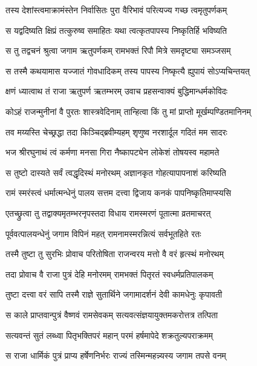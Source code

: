 \twolineshloka
{तस्य देशांस्त्वमाक्रामंस्तेन निर्वासितः पुरा}
{वैरिभावं परित्यज्य गच्छ त्वमृतुपर्णकम्}%

\twolineshloka
{स यद्वदिष्यति क्षिप्रं तत्कुरुष्व समाहितः}
{यथा त्वत्कृतपापस्य निष्कृतिर्हि भविष्यति}%

\twolineshloka
{स तु तद्वचनं श्रुत्वा जगाम ऋतुपर्णकम्}
{रामभक्तं रिपौ मित्रे समदृष्ट्या समञ्जसम्}%

\twolineshloka
{स तस्मै कथयामास यज्जातं गोवधादिकम्}
{तस्य पापस्य निष्कृत्यै ह्युपायं सोऽप्यचिन्तयत्}%

\twolineshloka
{क्षणं ध्यात्वाथ तं राजा ऋतुपर्ण ऋतम्भरम्}
{उवाच प्रहसन्वाक्यं बुद्धिमान्धर्मकोविदः}%

\twolineshloka
{कोऽहं राजन्मुनीनां वै पुरतः शास्त्रवेदिनाम्}
{तान्हित्वा किं तु मां प्राप्तो मूर्खम्पण्डितमानिनम्}%

\twolineshloka
{तव मय्यस्ति चेच्छ्रद्धा तदा किञ्चिद्ब्रवीम्यहम्}
{शृणुष्व नरशार्दूल गदितं मम सादरः}%

\twolineshloka
{भज श्रीरघुनाथं त्वं कर्मणा मनसा गिरा}
{नैष्कापट्येन लोकेशं तोषयस्व महामते}%

\twolineshloka
{स तुष्टो दास्यते सर्वं त्वद्धृदिस्थं मनोरथम्}
{अज्ञानकृत गोहत्यापापनाशं करिष्यति}%

\twolineshloka
{रामं स्मरंस्त्वं धर्मात्मन्धेनुं पालय सत्तम}
{दत्त्वा द्विजाय कनकं पापनिष्कृतिमाप्स्यसि}%


\twolineshloka
{एतच्छ्रुत्वा तु तद्वाक्यमृतम्भरनृपस्तदा}
{विधाय रामस्मरणं पूतात्मा व्रतमाचरत्}%

\twolineshloka
{पूर्ववत्पालयन्धेनुं जगाम विपिनं महत्}
{रामनामस्मरन्नित्यं सर्वभूतहिते रतः}%

\twolineshloka
{तस्मै तुष्टा तु सुरभिः प्रोवाच परितोषिता}
{राजन्वरय मत्तो वै वरं हृत्स्थं मनोरथम्}%

\twolineshloka
{तदा प्रोवाच वै राजा पुत्रं देहि मनोरमम्}
{रामभक्तं पितृरतं स्वधर्मप्रतिपालकम्}%

\twolineshloka
{तुष्टा दत्त्वा वरं सापि तस्मै राज्ञे सुतार्थिने}
{जगामादर्शनं देवी कामधेनुः कृपावती}%

\twolineshloka
{स काले प्राप्तवान्पुत्रं वैष्णवं रामसेवकम्}
{सत्यवत्संज्ञयायुक्तमकरोत्तत्र तत्पिता}%

\twolineshloka
{सत्यवन्तं सुतं लब्ध्वा पितृभक्तिपरं महान्}
{परमं हर्षमापेदे शक्रतुल्यपराक्रमम्}%

\twolineshloka
{स राजा धार्मिकं पुत्रं प्राप्य हर्षेणनिर्भरः}
{राज्यं तस्मिन्महन्न्यस्य जगाम तपसे वनम्}%

